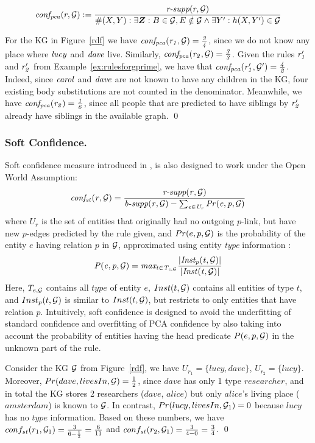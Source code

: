 \[
\mi{conf_{pca}}(r, \cG) := \frac{\textit{r-supp}(r, \cG)}{\#(X,Y): \exists \vec{Z}: B \in \cG, E \notin \cG  \wedge \exists Y': h(X,Y')\in \cG}
\]
\begin{example}
For the KG in Figure~\ref{rdf} we have $\mathit{conf_{pca}(r_1,\mathcal{G}) = \frac{3}{4}}$, since we do not know any place where $\mathit{lucy}$ and $\mathit{dave}$ live. Similarly, $\mathit{conf_{pca}(r_2,\mathcal{G}) = \frac{3}{3}}$.
Given the rules $\mathit{r_1'}$ and $\mathit{r_2'}$ from Example~\ref{ex:rulesforgprime}, we have that $\mathit{conf_{pca}(r_1',\mathcal{G}') = \frac{4}{2}}$. Indeed, since $\mathit{carol}$ and $\mathit{dave}$ are not known
to have any children in the KG, four existing body substitutions are not counted in the
denominator. Meanwhile, we have $\mathit{conf_{pca}(r_2) = \frac{1}{6}}$, since all people that are predicted to have siblings by $\mathit{r_2'}$ already have siblings in the available graph.
\qed
\end{example}

\subsubsection{Soft Confidence.} Soft confidence measure introduced in \cite{rdf2rules}, is also designed to work under the Open World Assumption:
\[\mathit{conf_{st}(r, \mathcal{G}) = \frac{\textit{r-supp}(r, \mathcal{G})}{\textit{b-supp}(r,\mathcal{G}) - \sum_{e \in U_r}Pr(e,p,\mathcal{G})}} \]
where $U_r$ is the set of entities that %
originally had no outgoing %
$p$-link, but have new $p$-edges predicted by the rule given, and $Pr(e,p,\mathcal{G})$ is the probability of the entity $e$ having relation $p$ in $\mathcal{G}$, approximated using entity \textit{type} information \cite{rdf2rules}:
\[\mathit{P(e,p,\mathcal{G})  = max_{t \in T_{e,\mathcal{G}}}\frac{|Inst_p(t, \mathcal{G})|}{|Inst(t, \mathcal{G})|}{}}\]
Here, $T_{e,\mathcal{G}}$ contains all $type$ of entity $e$, $Inst(t, \mathcal{G})$ contains all entities of type $t$, and $Inst_p(t, \mathcal{G})$ is similar to $Inst(t, \mathcal{G})$, but restricts to only entities that have relation $p$.
Intuitively, soft confidence is designed to avoid the underfitting of standard confidence and overfitting of PCA confidence by also taking into account the probability of entities having the head predicate $P(e,p, \mathcal{G})$ in the unknown part of the rule.
\begin{example}
Consider the KG $\mathcal{G}$ from Figure~\ref{rdf}, we have $U_{r_1} = \{lucy, dave\}$, $U_{r_2} = \{lucy\}$. Moreover, $Pr(dave,livesIn,\mathcal{G}) = \frac{1}{2}$, since $dave$ has only 1 type $researcher$, and in total the KG stores 
2 researchers ($dave$, $alice$) but only $alice$'s living place ($amsterdam$) is known to $\mathcal{G}$. In contrast, $Pr(lucy,livesIn,\mathcal{G}_1) = 0$ because $lucy$ has no $type$ information.
Based on these numbers, we have $conf_{st}(r_1,\mathcal{G}_1) = \frac{3}{6-\frac{1}{2}} = \frac{6}{11}$ and $conf_{st}(r_2,\mathcal{G}_1) = \frac{3}{4-0} = \frac{3}{4}$.
\qed
\end{example}
